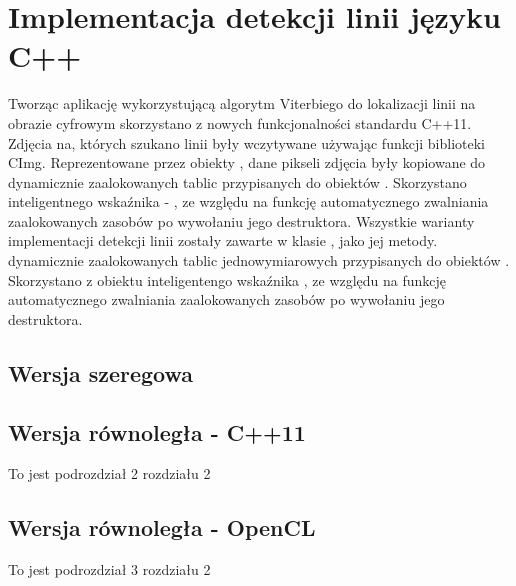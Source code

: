 \documentclass[document.tex]{subfiles}
\begin{document}
\section{Implementacja detekcji linii języku C++}
\indent Tworząc aplikację wykorzystującą algorytm Viterbiego do lokalizacji linii
na obrazie cyfrowym skorzystano z nowych funkcjonalności standardu C++11. 
Zdjęcia na, których szukano linii były wczytywane używając funkcji biblioteki
CImg. Reprezentowane przez obiekty , dane pikseli zdjęcia były kopiowane do
dynamicznie zaalokowanych tablic przypisanych do obiektów . Skorzystano inteligentnego wskaźnika -  , ze względu na funkcję automatycznego zwalniania zaalokowanych zasobów po wywołaniu jego destruktora.  
Wszystkie warianty implementacji detekcji linii zostały zawarte w klasie , 
jako jej metody.
dynamicznie zaalokowanych tablic jednowymiarowych przypisanych do obiektów . 
Skorzystano z obiektu inteligentengo wskaźnika  , 
ze względu na funkcję automatycznego zwalniania zaalokowanych zasobów po wywołaniu jego destruktora.  


\subsection{Wersja szeregowa}


 

 


\subsection{Wersja równoległa - C++11}
To jest podrozdział 2 rozdziału 2
\subsection{Wersja równoległa - OpenCL}
To jest podrozdział 3 rozdziału 2
\end{document}
